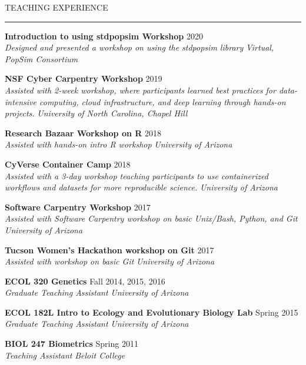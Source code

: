 \documentclass{resume} %
\renewenvironment{rSection}[1]{
\sectionskip
\textcolor{RoyalPurple}{\MakeUppercase{#1}}
\sectionlineskip
\hrule
\begin{list}{}{
\setlength{\leftmargin}{1.5em}
}
\item[]
}{
\end{list}
}
\begin{document}
\begin{rSection}{Teaching Experience}

    {\bf Introduction to using stdpopsim Workshop} \hfill 2020 \\ 
    {\em Designed and presented a workshop on using the stdpopsim library} \hfill {\em Virtual, PopSim Consortium}

    {\bf NSF Cyber Carpentry Workshop} \hfill 2019 \\ 
    {\em Assisted with 2-week workshop, where participants learned best practices for data-intensive computing, cloud infrastructure, and deep learning through hands-on projects.
    } \hfill {\em University of North Carolina, Chapel Hill}

    {\bf Research Bazaar Workshop on R} \hfill 2018 \\ 
    {\em Assisted with hands-on intro R workshop} \hfill {\em University of Arizona}

    {\bf CyVerse Container Camp} \hfill 2018 \\ 
    {\em Assisted with a 3-day workshop teaching participants to use containerized workflows and datasets for more reproducible science.} \hfill {\em University of Arizona}

    {\bf Software Carpentry Workshop} \hfill 2017 \\ 
    {\em Assisted with Software Carpentry workshop on basic Unix/Bash, Python, and Git} \hfill {\em University of Arizona}

    {\bf Tucson Women’s Hackathon workshop on Git} \hfill 2017 \\ 
    {\em Assisted with workshop on basic Git} \hfill {\em University of Arizona}

    {\bf ECOL 320 Genetics} \hfill Fall 2014, 2015, 2016 \\ 
    {\em Graduate Teaching Assistant} \hfill {\em University of Arizona}

    {\bf ECOL 182L Intro to Ecology and Evolutionary Biology Lab} \hfill Spring 2015 \\ 
    {\em Graduate Teaching Assistant} \hfill {\em University of Arizona}

    {\bf BIOL 247 Biometrics} \hfill Spring 2011 \\ 
    {\em Teaching Assistant} \hfill {\em Beloit College}

\end{rSection}

\end{document}
